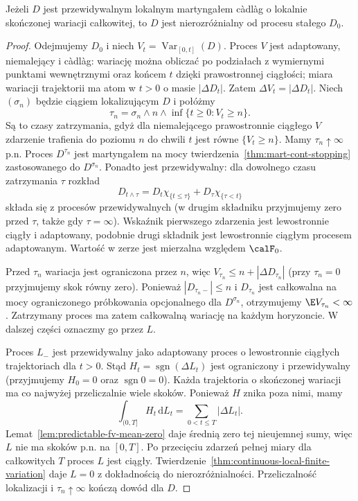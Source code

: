 \begin{twierdzenie}
\label{thm:predictable-fv-local-constant}
Jeżeli $D$ jest przewidywalnym lokalnym martyngałem
c\`adl\`ag o lokalnie skończonej wariacji całkowitej,
to $D$ jest nierozróżnialny od procesu stałego $D_0$.
\end{twierdzenie}
\begin{proof}
Odejmujemy $D_0$ i niech
$V_t=\operatorname{Var}_{[0,t]}(D)$.
Proces $V$ jest adaptowany, niemalejący i c\`adl\`ag:
wariację można obliczać po podziałach z wymiernymi
punktami wewnętrznymi oraz końcem $t$ dzięki
prawostronnej ciągłości; miara wariacji trajektorii
ma atom w $t>0$ o masie $|\Delta D_t|$.
Zatem $\Delta V_t=|\Delta D_t|$.
Niech $(\sigma_n)$ będzie ciągiem lokalizującym $D$
i połóżmy
\[
\tau_n=\sigma_n\wedge n\wedge
\inf\{t\ge0: V_t\ge n\}.
\]
Są to czasy zatrzymania, gdyż dla niemalejącego
prawostronnie ciągłego $V$ zdarzenie trafienia
do poziomu $n$ do chwili $t$ jest równe
$\{V_t\ge n\}$. Mamy $\tau_n\uparrow\infty$ p.n.
Proces $D^{\tau_n}$ jest martyngałem na mocy
twierdzenia~\ref{thm:mart-cont-stopping}
zastosowanego do $D^{\sigma_n}$.
Ponadto jest przewidywalny: dla dowolnego
czasu zatrzymania $\tau$ rozkład
\[
D_{t\wedge\tau}=D_t\chi_{\{t\le\tau\}}+
D_\tau\chi_{\{\tau<t\}}
\]
składa się z procesów przewidywalnych
(w drugim składniku przyjmujemy zero przed
$\tau$, także gdy $\tau=\infty$).
Wskaźnik pierwszego zdarzenia jest lewostronnie
ciągły i adaptowany, podobnie drugi składnik
jest lewostronnie ciągłym procesem adaptowanym.
Wartość w zerze jest mierzalna względem $\calF_0$.

Przed $\tau_n$ wariacja jest ograniczona przez $n$,
więc $V_{\tau_n}\le n+|\Delta D_{\tau_n}|$
(przy $\tau_n=0$ przyjmujemy skok równy zero).
Ponieważ $|D_{\tau_n-}|\le n$ i $D_{\tau_n}$
jest całkowalna na mocy ograniczonego próbkowania
opcjonalnego dla $D^{\sigma_n}$, otrzymujemy
$\E V_{\tau_n}<\infty$.
Zatrzymany proces ma zatem całkowalną wariację
na każdym horyzoncie.
W dalszej części oznaczmy go przez $L$.

Proces $L_-$ jest przewidywalny jako adaptowany
proces o lewostronnie ciągłych trajektoriach
dla $t>0$. Stąd
$H_t=\operatorname{sgn}(\Delta L_t)$
jest ograniczony i przewidywalny
(przyjmujemy $H_0=0$ oraz $\operatorname{sgn}0=0$).
Każda trajektoria o skończonej wariacji
ma co najwyżej przeliczalnie wiele skoków.
Ponieważ $H$ znika poza nimi, mamy
\[
\int_{(0,T]}H_t\,\mathrm dL_t
=\sum_{0<t\le T}|\Delta L_t|.
\]
Lemat~\ref{lem:predictable-fv-mean-zero}
daje średnią zero tej nieujemnej sumy,
więc $L$ nie ma skoków p.n. na $[0,T]$.
Po przecięciu zdarzeń pełnej miary dla
całkowitych $T$ proces $L$ jest ciągły.
Twierdzenie~\ref{thm:continuous-local-finite-variation}
daje $L=0$ z dokładnością do nierozróżnialności.
Przeliczalność lokalizacji i $\tau_n\uparrow\infty$
kończą dowód dla $D$.
\end{proof}

